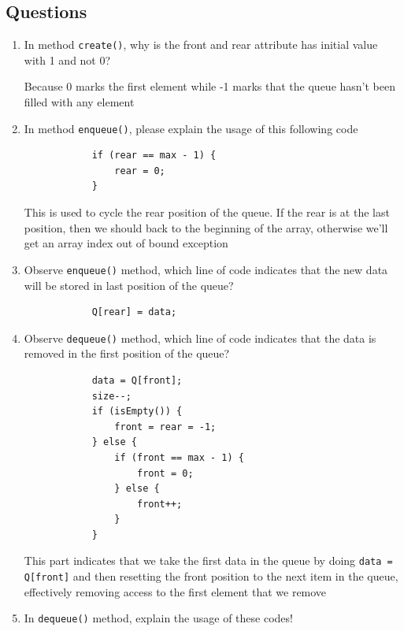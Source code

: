 \documentclass[12pt,titlepage]{article}
\begin{document}
\subsection*{Questions}
\begin{enumerate}
    \item {
        In method \texttt{create()}, why is the front and rear attribute has initial value with 1 and not 0?

        Because 0 marks the first element while -1 marks that the queue hasn't been filled with any element
    }
    \item {
        In method \texttt{enqueue()}, please explain the usage of this following code

        \begin{verbatim}
            if (rear == max - 1) {
                rear = 0;
            }
        \end{verbatim}

        This is used to cycle the rear position of the queue. If the rear is at the last position,
        then we should back to the beginning of the array, otherwise we'll get an array index out of bound exception
    }
    \item {
        Observe \texttt{enqueue()} method, which line of code indicates that the new data will be stored in last position
        of the queue?

        \begin{verbatim}
            Q[rear] = data;
        \end{verbatim}
    }
    \item {
        Observe \texttt{dequeue()} method, which line of code indicates that the data is removed in the first
        position of the queue?

        \begin{verbatim}
            data = Q[front];
            size--;
            if (isEmpty()) {
                front = rear = -1;
            } else {
                if (front == max - 1) {
                    front = 0;
                } else {
                    front++;
                }
            }
        \end{verbatim}

        This part indicates that we take the first data in the queue by doing \texttt{data = Q[front]}
        and then resetting the front position to the next item in the queue, effectively removing access to the first
        element that we remove
    }
    \item {
        In \texttt{dequeue()} method, explain the usage of these codes!
        
}
\end{enumerate}
\end{document}
